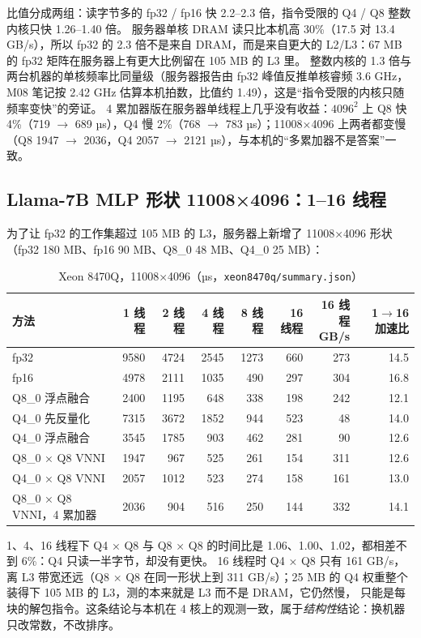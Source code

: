 \documentclass[11pt,a4paper]{ctexart}
\begin{document}
比值分成两组：读字节多的 fp32 / fp16 快 2.2--2.3 倍，指令受限的 Q4 / Q8 整数内核只快 1.26--1.40 倍。
服务器单核 DRAM 读只比本机高 30\%（17.5 对 13.4 GB/s），所以 fp32 的 2.3 倍不是来自 DRAM，而是来自更大的 L2/L3：67 MB 的 fp32 矩阵在服务器上有更大比例留在 105 MB 的 L3 里。
整数内核的 1.3 倍与两台机器的单核频率比同量级（服务器报告由 fp32 峰值反推单核睿频 3.6 GHz，M08 笔记按 2.42 GHz 估算本机拍数，比值约 1.49），这是“指令受限的内核只随频率变快”的旁证。
4 累加器版在服务器单线程上几乎没有收益：$4096^2$ 上 Q8 快 4\%（719 $\to$ 689 µs），Q4 慢 2\%（768 $\to$ 783 µs）；11008×4096 上两者都变慢（Q8 1947 $\to$ 2036，Q4 2057 $\to$ 2121 µs），与本机的“多累加器不是答案”一致。

\subsection{Llama-7B MLP 形状 11008×4096：1--16 线程}

为了让 fp32 的工作集超过 105 MB 的 L3，服务器上新增了 11008×4096 形状（fp32 180 MB、fp16 90 MB、Q8\_0 48 MB、Q4\_0 25 MB）：

\begin{table}[H]
\centering\small
\caption{Xeon 8470Q，11008×4096（µs，\texttt{xeon8470q/summary.json}）}\label{tab:xeon-mlp}
\begin{tabular}{lrrrrrrr}
\toprule
方法 & 1 线程 & 2 线程 & 4 线程 & 8 线程 & 16 线程 & \makecell{16 线程\\GB/s} & \makecell{1$\to$16\\加速比} \\
\midrule
fp32 & 9580 & 4724 & 2545 & 1273 & 660 & 273 & 14.5 \\
fp16 & 4978 & 2111 & 1035 & 490 & 297 & 304 & 16.8 \\
Q8\_0 浮点融合 & 2400 & 1195 & 648 & 338 & 198 & 242 & 12.1 \\
Q4\_0 先反量化 & 7315 & 3672 & 1852 & 944 & 523 & 48 & 14.0 \\
Q4\_0 浮点融合 & 3545 & 1785 & 903 & 462 & 281 & 90 & 12.6 \\
Q8\_0 × Q8 VNNI & 1947 & 967 & 525 & 261 & 154 & 311 & 12.6 \\
Q4\_0 × Q8 VNNI & 2057 & 1012 & 523 & 274 & 158 & 161 & 13.0 \\
Q8\_0 × Q8 VNNI，4 累加器 & 2036 & 904 & 516 & 250 & 144 & 332 & 14.1 \\
\bottomrule
\end{tabular}
\end{table}

\begin{findingbox}
1、4、16 线程下 Q4 × Q8 与 Q8 × Q8 的时间比是 1.06、1.00、1.02，都相差不到 6\%：Q4 只读一半字节，却没有更快。
16 线程时 Q4 × Q8 只有 161 GB/s，离 L3 带宽还远（Q8 × Q8 在同一形状上到 311 GB/s）；25 MB 的 Q4 权重整个装得下 105 MB 的 L3，测的本来就是 L3 而不是 DRAM，它仍然慢，
只能是每块的解包指令。这条结论与本机在 4 核上的观测一致，属于\emph{结构性}结论：换机器只改常数，不改排序。
\end{findingbox}
\end{document}
